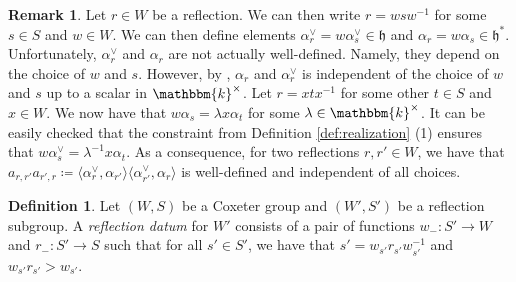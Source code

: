 \documentclass{amsart}
\renewcommand{\k}{\mathbbm{k}}
\newcommand{\fr}[1]{\mathfrak{#1}}
\theoremstyle{definition}
\newtheorem{definition}[subsubsection]{Definition}
\newtheorem{remark}[subsubsection]{Remark}
\numberwithin{equation}{subsection}
\begin{document}
\begin{remark}\label{rem:necessity_for_refln_datums}
Let $r \in W$ be a reflection. We can then write $r = wsw^{-1}$ for some $s \in S$ and $w \in W$.
We can then define elements $\alpha_r^{\vee} = w \alpha_s^{\vee} \in \fr{h}$ and $\alpha_r = w \alpha_s \in \fr{h}^*$.
Unfortunately, $\alpha_r^{\vee}$ and $\alpha_r$ are not actually well-defined. Namely, they depend on the choice of $w$ and $s$.
However, by \cite[Lemma 2.1]{Abe19}, $\alpha_{r}$ and $\alpha_r^{\vee}$ is independent of the choice of $w$ and $s$ up to a scalar in $\k^{\times}$. 
Let $r = xtx^{-1}$ for some other $t \in S$ and $x \in W$.
We now have that $w \alpha_s = \lambda x \alpha_t$ for some $\lambda \in \k^{\times}$. It can be easily checked that the constraint from Definition \ref{def:realization} (1) ensures that $w \alpha_s^{\vee} = \lambda^{-1} x \alpha_t$.
As a consequence, for two reflections $r,r' \in W$, we have that $a_{r,r'} a_{r',r} \coloneq \langle \alpha_r^{\vee}, \alpha_{r'} \rangle \langle \alpha_{r'}^{\vee}, \alpha_{r} \rangle$ is well-defined and independent of all choices.
\end{remark}

\begin{definition}
    Let $(W,S)$ be a Coxeter group and $(W', S')$ be a reflection subgroup.
    A \emph{reflection datum} for $W'$ consists of a pair of functions $w_{-} : S' \to W$ and $r_{-} : S' \to S$ such that for all $s' \in S'$, we have that $s' = w_{s'} r_{s'} w_{s'}^{-1}$ and $w_{s'} r_{s'} > w_{s'}$.
\end{definition}
\end{document}
